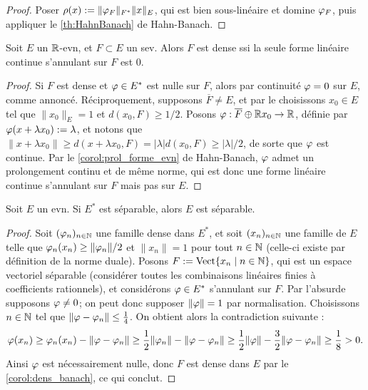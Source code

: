 \begin{proof}
	Poser $\rho(x) := \|\varphi_F\|_{F^*} \|x\|_E$, qui est bien sous-linéaire et domine $\varphi_F$, puis appliquer le \cref{th:HahnBanach} de Hahn-Banach.
\end{proof}

\begin{corollary}
\label{corol:dens_banach}
%
	Soit $E$ un $\mathbb{R}$-evn, et $F \subset E$ un sev. Alors $F$ est dense ssi la seule forme linéaire continue s'annulant sur $F$ est $0$.
\end{corollary}

\begin{proof}
	Si $F$ est dense et $\varphi \in E^*$ est nulle sur $F$, alors par continuité $\varphi = 0$ sur $E$, comme annoncé. 
	Réciproquement, supposons $\overline F \neq E$, et par le  choisissons $x_0\in E$ tel que $\|x_0\|_E = 1$ et $d(x_0,F)\geq 1/2$. Posons $\varphi : \overline F \oplus \mathbb{R} x_0 \to \mathbb{R}$, définie par $\varphi(x + \lambda x_0) := \lambda$, et notons que $\|x+\lambda x_0\| \geq d(x+\lambda x_0,F) = |\lambda| d(x_0,F) \geq |\lambda|/2$, de sorte que $\varphi$ est continue. 
	Par le \cref{corol:prol_forme_evn} de Hahn-Banach, $\varphi$ admet un prolongement continu et de même norme, qui est donc une forme linéaire continue s'annulant sur $F$ mais pas sur $E$. 
\end{proof}

\begin{exemple}
\label{ex:dualSeparable}
%
	Soit $E$ un evn. Si $E^*$ est séparable, alors $E$ est séparable. 
\end{exemple}

\begin{proof}
	Soit $(\varphi_n)_{n \in \mathbb{N}}$ une famille dense dans $E^*$, et soit $(x_n)_{n \in \mathbb{N}}$ une famille de $E$ telle que $\varphi_n(x_n) \geq \|\varphi_n\|/2$ et $\|x_n\|=1$ pour tout $n \in \mathbb{N}$ (celle-ci existe par définition de la norme duale).
	Posons $F := \operatorname{Vect}\{x_n \mid n \in \mathbb{N}\}$, qui est un espace vectoriel séparable (considérer toutes les combinaisons linéaires finies à coefficients rationnels), et considérons $\varphi \in E^*$ s'annulant sur $F$. Par l'absurde supposons $\varphi \neq 0$; on peut donc supposer $\|\varphi\|=1$ par normalisation. Choisissons $n\in \mathbb{N}$ tel que $\|\varphi -\varphi_n\| \leq \frac 1 4$. 
	On obtient alors la contradiction suivante : 
	\begin{equation*}
		\varphi(x_n) \geq \varphi_n(x_n) - \|\varphi-\varphi_n\| \geq \frac 1 2 \|\varphi_n\| - \|\varphi-\varphi_n\| \geq \frac 1 2 \|\varphi\| - \frac 3 2 \|\varphi-\varphi_n\| \geq \frac 1 8 > 0.
	\end{equation*} 
	Ainsi $\varphi$ est nécessairement nulle, donc $F$ est dense dans $E$ par le \cref{corol:dens_banach}, ce qui conclut. 
\end{proof}


